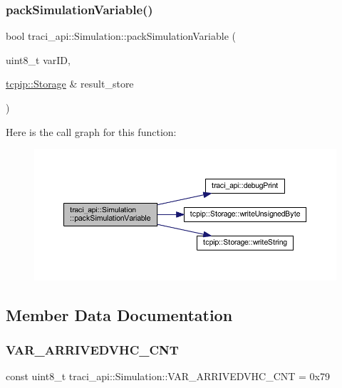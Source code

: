 \subsubsection{\texorpdfstring{pack\+Simulation\+Variable()}{packSimulationVariable()}}
{\footnotesize\ttfamily bool traci\+\_\+api\+::\+Simulation\+::pack\+Simulation\+Variable (\begin{DoxyParamCaption}\item[{uint8\+\_\+t}]{var\+ID,  }\item[{\hyperlink{classtcpip_1_1_storage}{tcpip\+::\+Storage} \&}]{result\+\_\+store }\end{DoxyParamCaption})}

Here is the call graph for this function\+:\nopagebreak
\begin{figure}[H]
\begin{center}
\leavevmode
\includegraphics[width=350pt]{classtraci__api_1_1_simulation_aa795b446802e3ddb196ebd29a215005e_cgraph}
\end{center}
\end{figure}


\subsection{Member Data Documentation}
\mbox{\label{classtraci__api_1_1_simulation_aa2763aba4aa46ba82dc9b1f258101ca4}} 
\subsubsection{\texorpdfstring{V\+A\+R\+\_\+\+A\+R\+R\+I\+V\+E\+D\+V\+H\+C\+\_\+\+C\+NT}{VAR\_ARRIVEDVHC\_CNT}}
{\footnotesize\ttfamily const uint8\+\_\+t traci\+\_\+api\+::\+Simulation\+::\+V\+A\+R\+\_\+\+A\+R\+R\+I\+V\+E\+D\+V\+H\+C\+\_\+\+C\+NT = 0x79\hspace{0.3cm}{\ttfamily [static]}}

